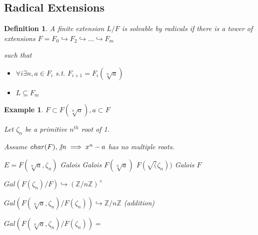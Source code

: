 \documentclass[twoside]{article}
\newcommand{\Z}{\mathbb{Z}}
\newcommand{\z}{\zeta}
\newtheorem{definition}[theorem]{Definition}
\newtheorem{example}[theorem]{Example}
\begin{document}
\subsection{Radical Extensions}

\begin{definition}
    A finite extension $L/F$ is solvable by radicals if there is a tower of extensions $F = F_0 \hookrightarrow F_2 \hookrightarrow \dots \hookrightarrow F_m$

    such that
    
    \begin{itemize}
        \item      $\forall i \exists n, a\in F_i $ s.t. $F_{i+1} = F_i(\sqrt[n]{a})$
        \item $L \subseteq F_m$
    \end{itemize}
\end{definition}

\begin{example}
    $F \subset F(\sqrt[n]a), a \subset F$

    Let $\zeta_n$ be a primitive $n^{th}$ root of 1.

    Assume $char(F), \not \vert n \implies x^n - a$ has no multiple roots. 

               $E = F(\sqrt[n]{a},\zeta_n)$
        Galois                              Galois
        $F(\sqrt[n]a)$                 $F(\sqrt(\zeta_n))$
                                        Galois
                            $F$

        $Gal(F(\z_n)/F) \hookrightarrow (\Z/n\Z)^{\times}$

        $Gal(F(\sqrt[n]{a},\zeta_n)/F(\z_n)) \hookrightarrow \Z/n\Z $ (addition)

        $Gal(F(\sqrt[n]{a},\zeta_n)/F(\z_n)) = $
\end{example}
\end{document}
